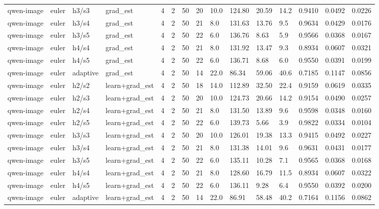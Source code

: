 \begin{tabular}{llllllrrlllllll}
qwen-image & euler & h3/s3 & grad_est & 4 & 2 & 50 & 20 & 10.0 & 124.80 & 20.59 & 14.2 & 0.9410 & 0.0492 & 0.0226 \\
qwen-image & euler & h3/s4 & grad_est & 4 & 2 & 50 & 21 & 8.0 & 131.63 & 13.76 & 9.5 & 0.9634 & 0.0429 & 0.0176 \\
qwen-image & euler & h3/s5 & grad_est & 4 & 2 & 50 & 22 & 6.0 & 136.76 & 8.63 & 5.9 & 0.9566 & 0.0368 & 0.0167 \\
qwen-image & euler & h4/s4 & grad_est & 4 & 2 & 50 & 21 & 8.0 & 131.92 & 13.47 & 9.3 & 0.8934 & 0.0607 & 0.0321 \\
qwen-image & euler & h4/s5 & grad_est & 4 & 2 & 50 & 22 & 6.0 & 136.71 & 8.68 & 6.0 & 0.9550 & 0.0391 & 0.0199 \\
qwen-image & euler & adaptive & grad_est & 4 & 2 & 50 & 14 & 22.0 & 86.34 & 59.06 & 40.6 & 0.7185 & 0.1147 & 0.0856 \\
qwen-image & euler & h2/s2 & learn+grad_est & 4 & 2 & 50 & 18 & 14.0 & 112.89 & 32.50 & 22.4 & 0.9159 & 0.0619 & 0.0335 \\
qwen-image & euler & h2/s3 & learn+grad_est & 4 & 2 & 50 & 20 & 10.0 & 124.73 & 20.66 & 14.2 & 0.9154 & 0.0490 & 0.0257 \\
qwen-image & euler & h2/s4 & learn+grad_est & 4 & 2 & 50 & 21 & 8.0 & 131.50 & 13.89 & 9.6 & 0.9598 & 0.0348 & 0.0160 \\
qwen-image & euler & h2/s5 & learn+grad_est & 4 & 2 & 50 & 22 & 6.0 & 139.73 & 5.66 & 3.9 & 0.9822 & 0.0334 & 0.0104 \\
qwen-image & euler & h3/s3 & learn+grad_est & 4 & 2 & 50 & 20 & 10.0 & 126.01 & 19.38 & 13.3 & 0.9415 & 0.0492 & 0.0227 \\
qwen-image & euler & h3/s4 & learn+grad_est & 4 & 2 & 50 & 21 & 8.0 & 131.38 & 14.01 & 9.6 & 0.9631 & 0.0431 & 0.0177 \\
qwen-image & euler & h3/s5 & learn+grad_est & 4 & 2 & 50 & 22 & 6.0 & 135.11 & 10.28 & 7.1 & 0.9565 & 0.0368 & 0.0168 \\
qwen-image & euler & h4/s4 & learn+grad_est & 4 & 2 & 50 & 21 & 8.0 & 128.60 & 16.79 & 11.5 & 0.8934 & 0.0607 & 0.0322 \\
qwen-image & euler & h4/s5 & learn+grad_est & 4 & 2 & 50 & 22 & 6.0 & 136.11 & 9.28 & 6.4 & 0.9550 & 0.0392 & 0.0200 \\
qwen-image & euler & adaptive & learn+grad_est & 4 & 2 & 50 & 14 & 22.0 & 86.91 & 58.48 & 40.2 & 0.7164 & 0.1156 & 0.0862 \\
\bottomrule
\end{tabular}
